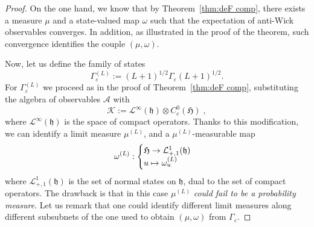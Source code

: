 \documentclass[10pt]{amsart}
\theoremstyle{definition}\newtheorem{defi}[theo]{Definition}\newtheorem{rema}[theo]{Remark}\newtheorem{exam}[theo]{Example}\newtheorem{exem}[theo]{Example}\newtheorem{nota}[theo]{Notation}
\newcommand{\cA}{\mathcal{A}}
\newcommand{\cL}{\mathcal{L}}
\newcommand{\cK}{\mathcal{K}}
\newcommand{\gH}{\mathfrak{H}}
\newcommand{\gh}{\mathfrak{h}}
\newcommand{\1}{\mathds{1}}
\renewcommand*{\to}{\mathchoice{\longrightarrow}{\rightarrow}{\rightarrow}{\rightarrow}}
\let\oldmapsto\mapsto
\renewcommand*{\mapsto}{\mathchoice{\longmapsto}{\oldmapsto}{\oldmapsto}{\oldmapsto}}
\begin{document}
\begin{proof}
On the one hand, we know that by Theorem~\ref{thm:deF comp}, there exists a measure $\mu$ and a state-valued map $\omega$ such that the expectation of anti-Wick observables converges. In addition, as illustrated in the proof of the theorem, such convergence identifies the couple $(\mu,\omega)$.

Now, let us define the family of states
\begin{equation*}
\Gamma_{\varepsilon}^{(L)}:=(L+1)^{1/2}\Gamma_{\varepsilon}(L+1)^{1/2}.
\end{equation*}
For $\Gamma_{\varepsilon}^{(L)}$ we proceed as in the proof of Theorem~\ref{thm:deF comp}, substituting the algebra of observables $\cA$ with
\begin{equation*}
\cK:= \cL^{\infty}(\gh)\otimes C_c^0( \gH)\;,
\end{equation*}
where $\cL^{\infty}(\gh)$ is the space of compact operators. Thanks to this modification, we can identify a limit measure $\mu^{(L)}$, and a $\mu^{(L)}$-measurable map
\begin{equation*}
\omega^{(L)} :
\begin{cases}
\gH \to \cL^1_{+,1} (\gh)\\
u \mapsto \omega^{(L)}_u
\end{cases}
\end{equation*}
where $\cL^1_{+,1} (\gh)$ is the set of normal states on $\gh$, dual to the set of compact operators. The drawback is that in this case $\mu^{(L)}$ \emph{could fail to be a probability measure}. Let us remark that one could identify different limit measures along different subsubnets of the one used to obtain $(\mu,\omega)$ from $\Gamma_{\varepsilon}$.


\end{proof}
\end{document}
